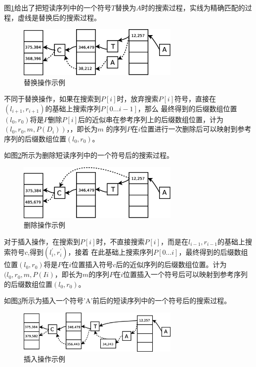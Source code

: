 \documentclass[UTF8,adobefonts]{ctexart}
\begin{document}
图\ref{fig:substitude}给出了把短读序列中的一个符号$T$替换为$A$时的搜索过程，实线为精确匹配的过程，虚线是替换后的搜索过程。

\begin{figure}[htbp]
    \centering
    \includegraphics[width=0.7\textwidth]{substitude.eps}
    \caption{替换操作示例} \label{fig:substitude}
\end{figure}

不同于替换操作，如果在搜索到$P[i]$时，放弃搜索$P[i]$符号，直接在$(l_{i+1},r_{i+1})$的基础上搜索序列$P[0\ldots i-1]$，那么
最终得到的后缀数组位置$(l_0,r_0)$将是$P$删除$P[i]$后的近似串在参考序列上的后缀数组位置，计为$(l_0,r_0,m,P(D_i))$，，即长为$m$
的序列$P$在$i$位置进行一次删除后可以映射到参考序列的后缀数组位置$(l_0,r_0)$。

如图\ref{fig:delete}所示为删除短读序列中的一个符号后的搜索过程。

\begin{figure}[htbp]
    \centering
    \includegraphics[width=0.7\textwidth]{delete.eps}
    \caption{删除操作示例} \label{fig:delete}
\end{figure}

对于插入操作，在搜索到$P[i]$时，不直接搜索$P[i]$，而是在$l_{i-1},r_{i-1}$的基础上搜索符号$c$,得到$(l_{i}^{'},r_{i}^{'})$，接着
在此基础上搜索序列$P[0\ldots i]$，最终得到的后缀数组位置$(l_0,r_0)$将是$P$在$i$位置插入符号$c$后的近似序列的后缀数组位置。计为
$(l_0,r_0,m,P(Ii)$，即长为$m$的序列$P$在$i$位置插入一个符号后可以映射到参考序列的后缀数组位置$(l_0,r_0)$。

如图\ref{fig:insert}所示为插入一个符号'A'前后的短读序列中的一个符号后的搜索过程。

\begin{figure}[htbp]
    \centering
    \includegraphics[width=0.7\textwidth]{insert.eps}
    \caption{插入操作示例} \label{fig:insert}
\end{figure}
\end{document}
